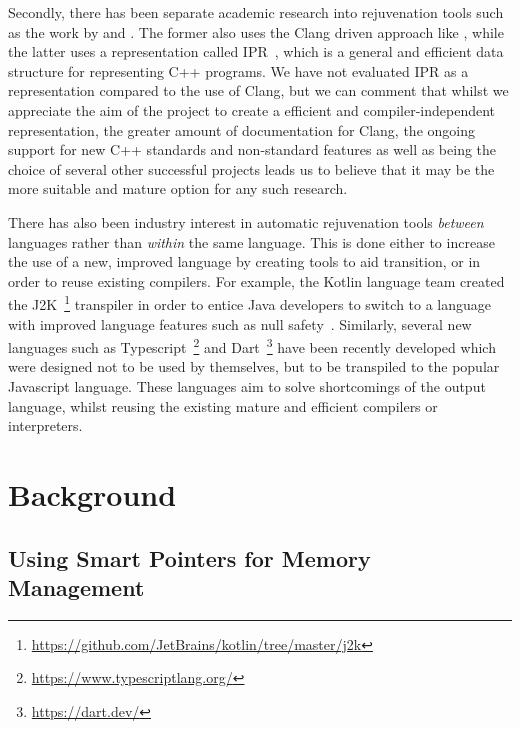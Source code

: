 \documentclass{mpaper}
\begin{document}
    Secondly, there has been separate academic research into rejuvenation tools such as the work by \citet{Huck2016} and \citet{Kumar2012}.
    The former also uses the Clang driven approach like \citet{Wright2013}, while the latter uses a representation called IPR~\cite{Dos2011}, which is a general and efficient data structure for representing C++ programs.
    We have not evaluated IPR as a representation compared to the use of Clang, but we can  comment that whilst we appreciate the aim of the project to create a efficient and compiler-independent representation, the greater amount of documentation for Clang, the ongoing support for new C++ standards and non-standard features as well as being the choice of several other successful projects leads us to believe that it may be the more suitable and mature option for any such research.
    
    There has also been industry interest in automatic rejuvenation tools \emph{between} languages rather than \emph{within} the same language. 
    This is done either to increase the use of a new, improved language by creating tools to aid transition, or in order to reuse existing compilers.
    For example, the Kotlin language team created the J2K~\footnote{\url{https://github.com/JetBrains/kotlin/tree/master/j2k}} transpiler in order to entice Java developers to switch to a language with improved language features such as null safety~\cite{Mateus2019}. 
    Similarly, several new languages such as Typescript~\footnote{\url{https://www.typescriptlang.org/}} and Dart~\footnote{\url{https://dart.dev/}} have been recently developed which were designed not to be used by themselves, but to be transpiled to the popular Javascript language.
    These languages aim to solve shortcomings of the output language, whilst reusing the existing mature and efficient compilers or interpreters.




    \section{Background}\label{sec:background}
    
    \subsection{Using Smart Pointers for Memory Management}\label{subsec:using-smart-pointers-for-memory-management}
\end{document}
